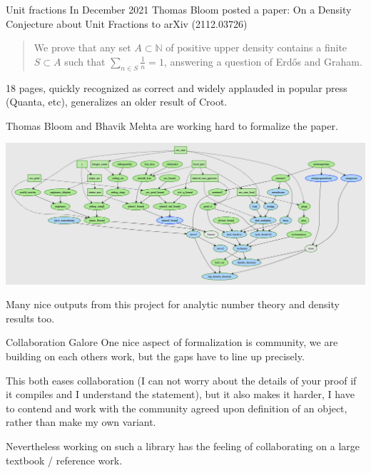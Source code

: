 \begin{frame}{Unit fractions}
    In December 2021 Thomas Bloom posted a paper: On a Density Conjecture about Unit Fractions to arXiv (2112.03726)
    \begin{quote}
         We prove that any set $A \subset \mathbb{N}$ of positive upper density contains a finite $S \subset A$ such that $\sum_{n \in S} \frac{1}{n}=1$, answering a question of Erdős and Graham.
    \end{quote}
    18 pages, quickly recognized as correct and widely applauded in popular press (Quanta, etc), generalizes an older result of Croot.

    Thomas Bloom and Bhavik Mehta are working hard to formalize the paper.
\end{frame}

\begin{frame}
    \includegraphics[width=1.1\linewidth]{unit.png}

    Many nice outputs from this project for analytic number theory and density results too.
\end{frame}

\begin{frame}{Collaboration Galore}
    One nice aspect of formalization is community, we are building on each others work, but the gaps have to line up precisely.

    This both eases collaboration (I can not worry about the details of your proof if it compiles and I understand the statement), but it also makes it harder, I have to contend and work with the community agreed upon definition of an object, rather than make my own variant.

    Nevertheless working on such a library has the feeling of collaborating on a large textbook / reference work.
\end{frame}

